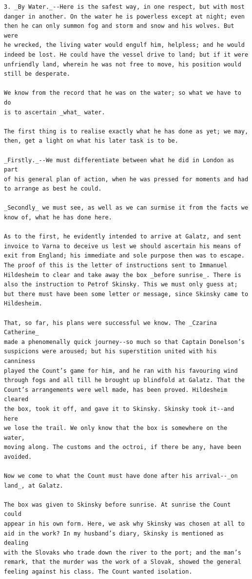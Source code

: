 \documentclass{article}
\begin{document}
\begin{verbatim}
3. _By Water._--Here is the safest way, in one respect, but with most
danger in another. On the water he is powerless except at night; even
then he can only summon fog and storm and snow and his wolves. But were
he wrecked, the living water would engulf him, helpless; and he would
indeed be lost. He could have the vessel drive to land; but if it were
unfriendly land, wherein he was not free to move, his position would
still be desperate.

We know from the record that he was on the water; so what we have to do
is to ascertain _what_ water.

The first thing is to realise exactly what he has done as yet; we may,
then, get a light on what his later task is to be.

_Firstly._--We must differentiate between what he did in London as part
of his general plan of action, when he was pressed for moments and had
to arrange as best he could.

_Secondly_ we must see, as well as we can surmise it from the facts we
know of, what he has done here.

As to the first, he evidently intended to arrive at Galatz, and sent
invoice to Varna to deceive us lest we should ascertain his means of
exit from England; his immediate and sole purpose then was to escape.
The proof of this is the letter of instructions sent to Immanuel
Hildesheim to clear and take away the box _before sunrise_. There is
also the instruction to Petrof Skinsky. This we must only guess at;
but there must have been some letter or message, since Skinsky came to
Hildesheim.

That, so far, his plans were successful we know. The _Czarina Catherine_
made a phenomenally quick journey--so much so that Captain Donelson’s
suspicions were aroused; but his superstition united with his canniness
played the Count’s game for him, and he ran with his favouring wind
through fogs and all till he brought up blindfold at Galatz. That the
Count’s arrangements were well made, has been proved. Hildesheim cleared
the box, took it off, and gave it to Skinsky. Skinsky took it--and here
we lose the trail. We only know that the box is somewhere on the water,
moving along. The customs and the octroi, if there be any, have been
avoided.

Now we come to what the Count must have done after his arrival--_on
land_, at Galatz.

The box was given to Skinsky before sunrise. At sunrise the Count could
appear in his own form. Here, we ask why Skinsky was chosen at all to
aid in the work? In my husband’s diary, Skinsky is mentioned as dealing
with the Slovaks who trade down the river to the port; and the man’s
remark, that the murder was the work of a Slovak, showed the general
feeling against his class. The Count wanted isolation.


\end{verbatim}
\end{document}

